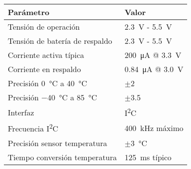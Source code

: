 	\begin{tabular}{ll}
		\toprule
		\textbf{Parámetro} & \textbf{Valor} \\
		\midrule
		Tensión de operación & \SI{2.3}{\volt} - \SI{5.5}{\volt} \\
		Tensión de batería de respaldo & \SI{2.3}{\volt} - \SI{5.5}{\volt} \\
		Corriente activa típica & \SI{200}{\micro\ampere} @ \SI{3.3}{\volt} \\
		Corriente en respaldo & \SI{0.84}{\micro\ampere} @ \SI{3.0}{\volt} \\
		Precisión \SI{0}{\celsius} a \SI{40}{\celsius} & $\pm$\SI{2}{\ppm} \\
		Precisión \SI{-40}{\celsius} a \SI{85}{\celsius} & $\pm$\SI{3.5}{\ppm} \\
		Interfaz & I\textsuperscript{2}C \\
		Frecuencia I\textsuperscript{2}C & \SI{400}{\kilo\hertz} máximo \\
		Precisión sensor temperatura & $\pm$\SI{3}{\celsius} \\
		Tiempo conversión temperatura & \SI{125}{\milli\second} típico \\
		\bottomrule
	\end{tabular}